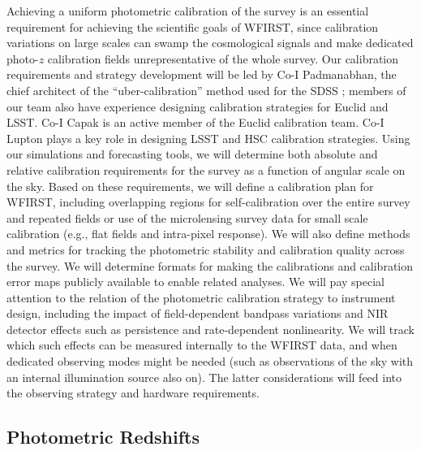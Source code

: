 Achieving a uniform photometric calibration of the survey is an essential requirement
for achieving the scientific goals of WFIRST, since calibration variations on large
scales can swamp the cosmological signals and make dedicated photo-$z$ calibration
fields unrepresentative of the whole survey.
Our calibration requirements and
strategy development will be led by Co-I Padmanabhan, the chief
architect of the ``uber-calibration'' method used for the SDSS \cite{Padmanabhan2008};
members of our team also have experience designing calibration strategies for
Euclid and LSST.  Co-I Capak is an active member of the Euclid calibration team. Co-I Lupton plays a
key role in designing LSST and HSC calibration strategies.
Using our simulations and forecasting tools, we will determine both
absolute and relative calibration requirements for the survey as a function
of angular scale on the sky. Based on these requirements, we will
define a calibration plan for WFIRST, including overlapping regions
for self-calibration over the entire survey and repeated fields or use of
the microlensing survey data for small scale calibration (e.g., flat fields
and intra-pixel response).  We will also define methods and metrics for
tracking the photometric stability and calibration quality
across the survey.
We will determine formats for making the calibrations and calibration
error maps publicly available to enable related analyses.
We will pay special attention to the relation of the photometric calibration
strategy to instrument design, including the impact of field-dependent bandpass
variations and NIR detector effects such as persistence and rate-dependent nonlinearity.
We will track which such effects can be measured internally to the WFIRST data, and
when dedicated observing modes might be needed (such as observations of the sky with
an internal illumination source also on). The latter considerations will feed into
the observing strategy and hardware requirements.

\subsection{Photometric Redshifts}
\label{sec:wl_calibration}

